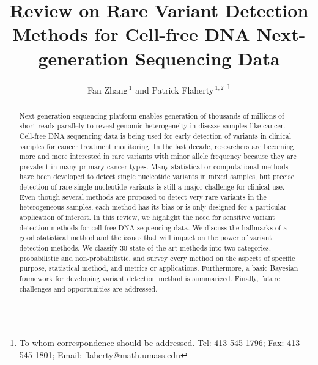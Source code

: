 \documentclass[a4,center,fleqn]{NAR}
\begin{document}
\title{Review on Rare Variant Detection Methods for Cell-free DNA Next-generation Sequencing Data}

\author{%
Fan Zhang\,$^{1}$
and Patrick Flaherty\,$^{1, 2}$
\footnote{To whom correspondence should be addressed.
Tel: 413-545-1796; Fax: 413-545-1801; Email: flaherty@math.umass.edu}}



\address{%
$^{1}$Department of Biomedical Engineering, Worcester Polytechnic Institute, MA, USA
and
$^{2}$Department of Mathematics and Statistics, University of Massachusetts, Amherst, MA, USA}


\maketitle

\begin{abstract}
Next-generation sequencing platform enables generation of thousands of millions of short reads parallely to reveal genomic heterogeneity in disease samples like cancer.
Cell-free DNA sequencing data is being used for early detection of variants in clinical samples for cancer treatment monitoring.
In the last decade, researchers are becoming more and more interested in rare variants with minor allele frequency because they are prevalent in many primary cancer types.
Many statistical or computational methods have been developed to detect single nucleotide variants in mixed samples, but precise detection of rare single nucleotide variants is still a major challenge for clinical use.
Even though several methods are proposed to detect very rare variants in the heterogeneous samples, each method has its bias or is only designed for a particular application of interest.
In this review, we highlight the need for sensitive variant detection methods for cell-free DNA sequencing data.
We discuss the hallmarks of a good statistical method and the issues that will impact on the power of variant detection methods.
We classify 30 state-of-the-art methods into two categories, probabilistic and non-probabilistic, and survey every method on the aspects of specific purpose, statistical method, and metrics or applications.
Furthermore, a basic Bayesian framework for developing variant detection method is summarized.
Finally, future challenges and opportunities are addressed.

\end{abstract}
\end{document}
